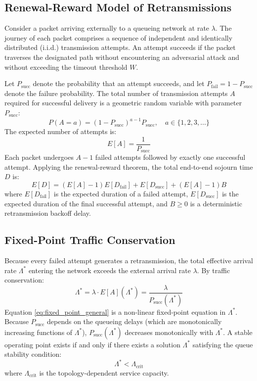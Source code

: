 \documentclass[12pt,onecolumn]{article}
\begin{document}
\subsection{Renewal-Reward Model of Retransmissions}
Consider a packet arriving externally to a queueing network at rate $\lambda$. The journey of each packet comprises a sequence of independent and identically distributed (i.i.d.) transmission attempts. An attempt succeeds if the packet traverses the designated path without encountering an adversarial attack and without exceeding the timeout threshold $W$.

Let $P_{\text{succ}}$ denote the probability that an attempt succeeds, and let $P_{\text{fail}} = 1 - P_{\text{succ}}$ denote the failure probability. The total number of transmission attempts $A$ required for successful delivery is a geometric random variable with parameter $P_{\text{succ}}$:
\begin{equation}
P(A = a) = (1 - P_{\text{succ}})^{a-1} P_{\text{succ}}, \quad a \in \{1, 2, 3, \dots\}
\end{equation}
The expected number of attempts is:
\begin{equation}
E[A] = \frac{1}{P_{\text{succ}}}
\end{equation}
Each packet undergoes $A - 1$ failed attempts followed by exactly one successful attempt. Applying the renewal-reward theorem, the total end-to-end sojourn time $D$ is:
\begin{equation}
E[D] = (E[A] - 1) E[D_{\text{fail}}] + E[D_{\text{succ}}] + (E[A] - 1) B
\label{eq:general_delay}
\end{equation}
where $E[D_{\text{fail}}]$ is the expected duration of a failed attempt, $E[D_{\text{succ}}]$ is the expected duration of the final successful attempt, and $B \ge 0$ is a deterministic retransmission backoff delay.

\subsection{Fixed-Point Traffic Conservation}
Because every failed attempt generates a retransmission, the total effective arrival rate $\Lambda^*$ entering the network exceeds the external arrival rate $\lambda$. By traffic conservation:
\begin{equation}
\Lambda^* = \lambda \cdot E[A](\Lambda^*) = \frac{\lambda}{P_{\text{succ}}(\Lambda^*)}
\label{eq:fixed_point_general}
\end{equation}
Equation \eqref{eq:fixed_point_general} is a non-linear fixed-point equation in $\Lambda^*$. Because $P_{\text{succ}}$ depends on the queueing delays (which are monotonically increasing functions of $\Lambda^*$), $P_{\text{succ}}(\Lambda^*)$ decreases monotonically with $\Lambda^*$. A stable operating point exists if and only if there exists a solution $\Lambda^*$ satisfying the queue stability condition:
\begin{equation}
\Lambda^* < \Lambda_{\text{crit}}
\end{equation}
where $\Lambda_{\text{crit}}$ is the topology-dependent service capacity.
\end{document}
